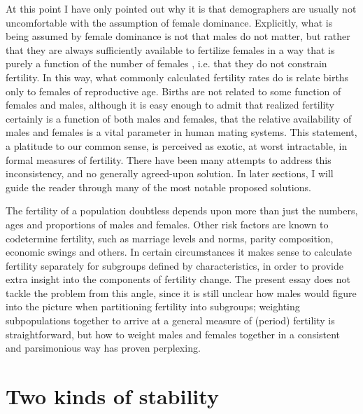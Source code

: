 \documentclass[reqno,12pt,oneside,a4paper]{report} %
\theoremstyle{plain}
\theoremstyle{definition}
\theoremstyle{remark}
\numberwithin{theorem}{chapter}     %
\begin{document}
At this point I have only pointed out why it is that demographers are usually not uncomfortable with the assumption of female dominance. Explicitly, what is being assumed by female dominance is not that males do not matter, but rather that they are always sufficiently available to fertilize females in a way that is purely a function of the number of females \citep{caswell2001matrix}, i.e. that they do not constrain fertility. In this way, what commonly calculated fertility rates do is relate births only to females of reproductive age. Births are not related to some function of females and males, although it is easy enough to admit that realized fertility certainly is a function of both males and females, that the relative availability of males and females is a vital parameter in human mating systems. This statement, a platitude to our common sense, is perceived as exotic, at worst intractable, in formal measures of fertility. There have been many attempts to address this inconsistency, and no generally agreed-upon solution. In later sections, I will guide the reader through many of the most notable proposed solutions.

The fertility of a population doubtless depends upon more than just the numbers, ages and proportions of males and females. Other risk factors are known to codetermine fertility, such as marriage levels and norms, parity composition, economic swings and others. In certain circumstances it makes sense to calculate fertility separately for subgroups defined by characteristics, in order to provide extra insight into the components of fertility change. The present essay does not tackle the problem from this angle, since it is still unclear how males would figure into the picture when partitioning fertility into subgroups; weighting subpopulations together to arrive at a general measure of (period) fertility is straightforward, but how to weight males and females together in a consistent and parsimonious way has proven perplexing.

\section{Two kinds of stability}
\end{document}
